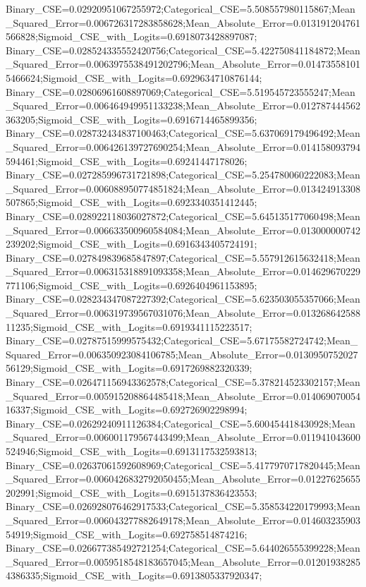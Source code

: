 Binary_CSE=0.02920951067255972;Categorical_CSE=5.508557980115867;Mean_Squared_Error=0.006726317283858628;Mean_Absolute_Error=0.013191204761566828;Sigmoid_CSE_with_Logits=0.6918073428897087;
Binary_CSE=0.028524335552420756;Categorical_CSE=5.422750841184872;Mean_Squared_Error=0.0063975538491202796;Mean_Absolute_Error=0.014735581015466624;Sigmoid_CSE_with_Logits=0.6929634710876144;
Binary_CSE=0.02806961608897069;Categorical_CSE=5.519545723555247;Mean_Squared_Error=0.006464949951133238;Mean_Absolute_Error=0.012787444562363205;Sigmoid_CSE_with_Logits=0.6916714465899356;
Binary_CSE=0.028732434837100463;Categorical_CSE=5.637069179496492;Mean_Squared_Error=0.006426139727690254;Mean_Absolute_Error=0.014158093794594461;Sigmoid_CSE_with_Logits=0.69241447178026;
Binary_CSE=0.027285996731721898;Categorical_CSE=5.254780060222083;Mean_Squared_Error=0.006088950774851824;Mean_Absolute_Error=0.013424913308507865;Sigmoid_CSE_with_Logits=0.6923340351412445;
Binary_CSE=0.028922118036027872;Categorical_CSE=5.645135177060498;Mean_Squared_Error=0.006633500960584084;Mean_Absolute_Error=0.013000000742239202;Sigmoid_CSE_with_Logits=0.6916343405724191;
Binary_CSE=0.027849839685847897;Categorical_CSE=5.557912615632418;Mean_Squared_Error=0.006315318891093358;Mean_Absolute_Error=0.014629670229771106;Sigmoid_CSE_with_Logits=0.6926404961153895;
Binary_CSE=0.028234347087227392;Categorical_CSE=5.623503055357066;Mean_Squared_Error=0.006319739567031076;Mean_Absolute_Error=0.01326864258811235;Sigmoid_CSE_with_Logits=0.6919341115223517;
Binary_CSE=0.02787515999575432;Categorical_CSE=5.67175582724742;Mean_Squared_Error=0.006350923084106785;Mean_Absolute_Error=0.013095075202756129;Sigmoid_CSE_with_Logits=0.6917269882320339;
Binary_CSE=0.026471156943362578;Categorical_CSE=5.378214523302157;Mean_Squared_Error=0.005915208864485418;Mean_Absolute_Error=0.01406907005416337;Sigmoid_CSE_with_Logits=0.692726902298994;
Binary_CSE=0.02629240911126384;Categorical_CSE=5.600454418430928;Mean_Squared_Error=0.006001179567443499;Mean_Absolute_Error=0.011941043600524946;Sigmoid_CSE_with_Logits=0.6913117532593813;
Binary_CSE=0.02637061592608969;Categorical_CSE=5.4177970717820445;Mean_Squared_Error=0.0060426832792050455;Mean_Absolute_Error=0.01227625655202991;Sigmoid_CSE_with_Logits=0.6915137836423553;
Binary_CSE=0.026928076462917533;Categorical_CSE=5.358534220179993;Mean_Squared_Error=0.006043277882649178;Mean_Absolute_Error=0.01460323590354919;Sigmoid_CSE_with_Logits=0.692758514874216;
Binary_CSE=0.026677385492721254;Categorical_CSE=5.644026555399228;Mean_Squared_Error=0.0059518548183657045;Mean_Absolute_Error=0.012019382854386335;Sigmoid_CSE_with_Logits=0.6913805337920347;
